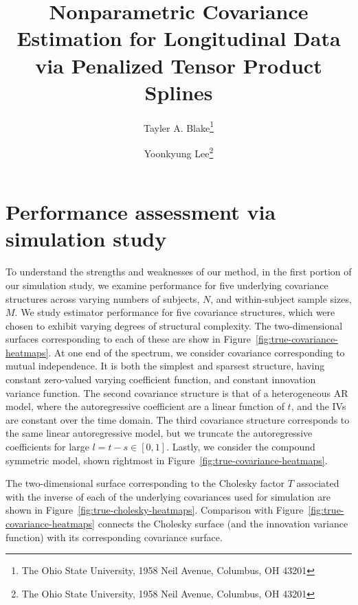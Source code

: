 \documentclass[12pt]{article}
\theoremstyle{definition}
\def\bL{\mathbf{L}}
\begin{document}
\def\bL{\mathbf{L}}



\title{ Nonparametric Covariance Estimation for Longitudinal Data via Penalized Tensor Product Splines}

\author{Tayler A. Blake\thanks{The Ohio State University, 1958 Neil Avenue, Columbus, OH 43201} \and  Yoonkyung Lee\thanks{The Ohio State University, 1958 Neil Avenue, Columbus, OH 43201}}


\maketitle

\section{Performance assessment via simulation study} 


To understand the strengths and weaknesses of our method, in the first portion of our simulation study, we examine performance for five underlying covariance structures across varying numbers of subjects, $N$, and within-subject sample sizes, $M$.  We study estimator performance for five covariance structures, which were chosen to exhibit varying degrees of structural complexity. The two-dimensional surfaces corresponding to each of these are show in Figure~\ref{fig:true-covariance-heatmaps}. At one end of the spectrum, we consider covariance corresponding to mutual independence. It is both the simplest and sparsest structure, having constant zero-valued varying coefficient function, and constant innovation variance function. The second covariance structure is that of a heterogeneous AR model, where the autoregressive coefficient are a linear function of $t$, and the IVs are constant over the time domain.  The third covariance structure corresponds to the same linear autoregressive model, but we truncate the autoregressive coefficients for large $l = t - s \in \left[0,1\right]$. Lastly, we consider the compound symmetric model, shown rightmost in Figure~\ref{fig:true-covariance-heatmaps}.

\bigskip



\bigskip

The two-dimensional surface corresponding to the Cholesky factor $T$ associated with the inverse of each of the underlying covariances used for simulation are shown in Figure~\ref{fig:true-cholesky-heatmaps}. Comparison with Figure~\ref{fig:true-covariance-heatmaps}  connects the Cholesky surface (and the innovation variance function) with its corresponding covariance surface.
\end{document}
